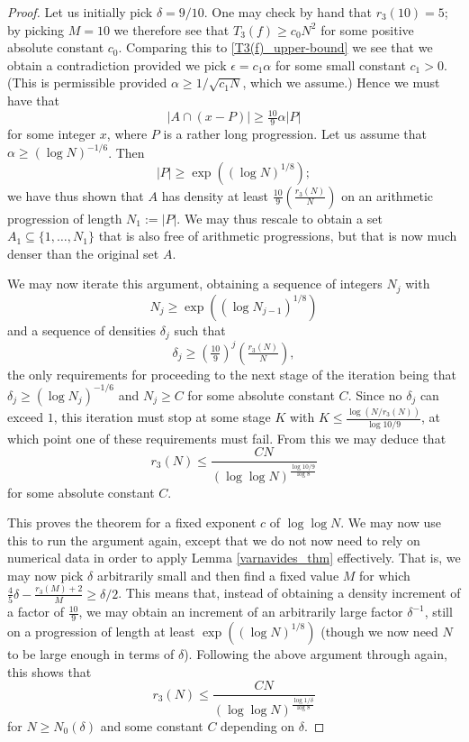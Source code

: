 \documentclass[12pt,a4paper,reqno]{amsart}
\numberwithin{equation}{section}
\theoremstyle{plain}
\theoremstyle{definition}
\renewcommand{\leq}{\leqslant}
\renewcommand{\geq}{\geqslant}
\renewcommand{\subset}{\subseteq}
\begin{document}
\begin{proof}
Let us initially pick $\delta = 9/10$. One may check by hand that $r_3(10) = 5$; by picking $M = 10$ we therefore see that $T_3(f) \geq c_0 N^2$ for some positive absolute constant $c_0$. Comparing this to \eqref{T3(f)_upper-bound} we see that we obtain a contradiction provided we pick $\epsilon = c_1 \alpha$ for some small constant $c_1 > 0$. (This is permissible provided $\alpha \geq 1/\sqrt{c_1 N}$, which we assume.) Hence we must have that 
\[ |A \cap (x-P)| \geq \tfrac{10}{9} \alpha |P| \]
for some integer $x$, where $P$ is a rather long progression. Let us assume that $\alpha \geq (\log N)^{-1/6}$. Then 
\[ |P| \geq \exp\left( (\log N)^{1/8} \right); \]
we have thus shown that $A$ has density at least $\tfrac{10}{9} \left(\tfrac{r_3(N)}{N}\right)$ on an arithmetic progression of length $N_1 := |P|$. We may thus rescale to obtain a set $A_1 \subset \{1,\ldots, N_1\}$ that is also free of arithmetic progressions, but that is now much denser than the original set $A$.

We may now iterate this argument, obtaining a sequence of integers $N_j$ with 
\[ N_j \geq \exp\left( (\log N_{j-1})^{1/8} \right) \]
and a sequence of densities $\delta_j$ such that 
\[ \delta_j \geq \left(\tfrac{10}{9}\right)^j \left(\tfrac{r_3(N)}{N}\right), \]
the only requirements for proceeding to the next stage of the iteration being that $\delta_j \geq (\log N_j)^{-1/6}$ and $N_j \geq C$ for some absolute constant $C$. Since no $\delta_j$ can exceed $1$, this iteration must stop at some stage $K$ with $K \leq \tfrac{\log(N/r_3(N))}{\log 10/9}$, at which point one of these requirements must fail. From this we may deduce that
\[ r_3(N) \leq \frac{C N}{(\log\log N)^{\frac{\log 10/9}{\log 8}}} \]
for some absolute constant $C$.

This proves the theorem for a fixed exponent $c$ of $\log\log N$. We may now use this to run the argument again, except that we do not now need to rely on numerical data in order to apply Lemma \ref{varnavides_thm} effectively. That is, we may now pick $\delta$ arbitrarily small and then find a fixed value $M$ for which $\tfrac{4}{5}\delta - \tfrac{r_3(M)+2}{M} \geq \delta/2$. This means that, instead of obtaining a density increment of a factor of $\tfrac{10}{9}$, we may obtain an increment of an arbitrarily large factor $\delta^{-1}$, still on a progression of length at least $\exp\left( (\log N)^{1/8} \right)$ (though we now need $N$ to be large enough in terms of $\delta$). Following the above argument through again, this shows that 
\[ r_3(N) \leq \frac{C N}{(\log\log N)^{\frac{\log 1/\delta}{\log 8}}} \]
for $N \geq N_0(\delta)$ and some constant $C$ depending on $\delta$.
\end{proof}
\end{document}
